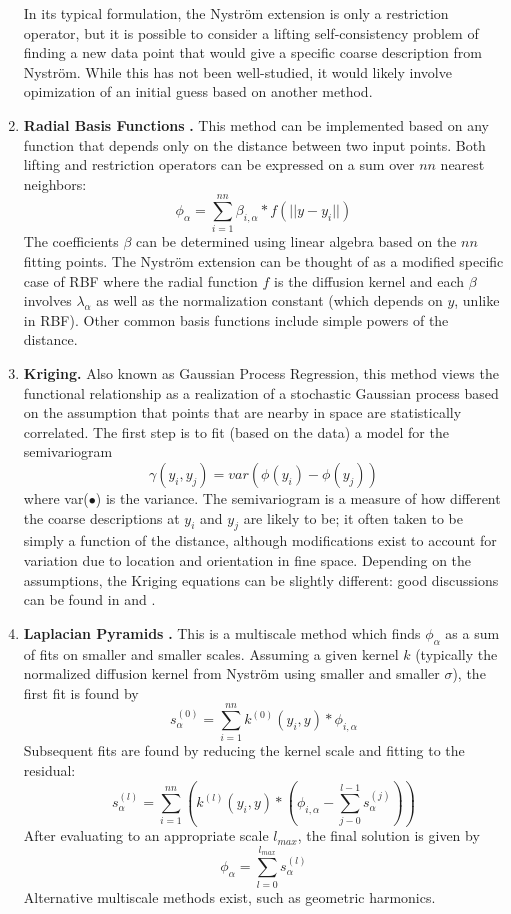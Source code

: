 \documentclass[12pt]{article}
\begin{document}
\begin{enumerate}
In its typical formulation, the Nystr\"om extension is only a restriction operator, but it is possible to consider a lifting self-consistency problem of finding a new data point that would give a specific coarse description from Nystr\"om. While this has not been well-studied, it would likely involve opimization of an initial guess based on another method.
\item \textbf{Radial Basis Functions }\cite{Press2007}\textbf{.}   This method can be implemented based on any function that depends only on the distance between two input points. Both lifting and restriction operators can be expressed on a sum over $nn$ nearest neighbors:
\[
\phi_{\alpha} =\sum_{i=1}^{nn} \beta_{i,\alpha}*f(||y-y_i||)
\]
The coefficients $\beta$ can be determined using linear algebra based on the $nn$ fitting points. The Nystr\"om extension can be thought of as a modified specific case of RBF where the radial function $f$ is the diffusion kernel and each $\beta$ involves $\lambda_\alpha$ as well as the normalization constant (which depends on $y$, unlike in RBF). Other common basis functions include simple powers of the distance.
\item \textbf{Kriging.} Also known as Gaussian Process Regression, this method views the functional relationship as a realization of a stochastic Gaussian process based on the assumption that points that are nearby in space are statistically correlated. The first step is to fit (based on the data) a model for the semivariogram
\[
\gamma(y_i,y_j)=var(\phi(y_i)-\phi(y_j))
\]
where var($\bullet$) is the variance. The semivariogram is a measure of how different the coarse descriptions at $y_i$ and $y_j$ are likely to be; it often taken to be simply a function of the distance, although modifications exist to account for variation due to location and orientation in fine space. Depending on the assumptions, the Kriging equations can be slightly different: good discussions can be found in \cite{Press2007} and \cite{Isaaks1989}.
\item \textbf{Laplacian Pyramids }\cite{Dsilva2013}\textbf{.}   This is a multiscale method which finds $\phi_\alpha$ as a sum of fits on smaller and smaller scales. Assuming a given kernel $k$ (typically the normalized diffusion kernel from Nystr\"om using smaller and smaller $\sigma$), the first fit is found by
\[
s^{(0)}_\alpha=\sum_{i=1}^{nn} k^{(0)}(y_i,y)*\phi_{i,\alpha}
\]
Subsequent fits are found by reducing the kernel scale and fitting to the residual:
\[
s^{(l)}_\alpha=\sum_{i=1}^{nn} \left( k^{(l)}(y_i,y)*(\phi_{i,\alpha}-\sum_{j-0}^{l-1}s^{(j)}_\alpha )\right)
\]
After evaluating to an appropriate scale $l_{max}$, the final solution is given by
\[
\phi_\alpha=\sum_{l=0}^{l_{max}}s^{(l)}_\alpha
\]
Alternative multiscale methods exist, such as geometric harmonics.
\end{enumerate}
\end{document}
